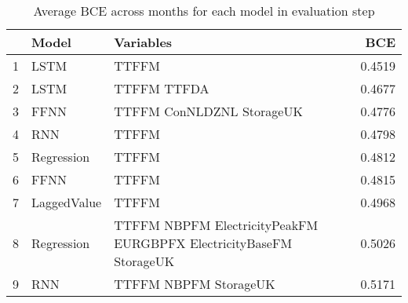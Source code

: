 \begin{table}[ht]
\centering
\begin{tabular}{rllr}
  \hline
 & Model & Variables & BCE \\ 
  \hline
1 & LSTM & TTFFM  & 0.4519 \\ 
  2 & LSTM & TTFFM TTFDA & 0.4677 \\ 
  3 & FFNN & TTFFM ConNLDZNL StorageUK & 0.4776 \\ 
  4 & RNN & TTFFM  & 0.4798 \\ 
  5 & Regression & TTFFM  & 0.4812 \\ 
  6 & FFNN & TTFFM  & 0.4815 \\ 
  7 & LaggedValue & TTFFM  & 0.4968 \\ 
  8 & Regression & TTFFM NBPFM ElectricityPeakFM EURGBPFX ElectricityBaseFM StorageUK & 0.5026 \\ 
  9 & RNN & TTFFM NBPFM StorageUK & 0.5171 \\ 
   \hline
\end{tabular}
\caption{Average BCE across months for each model in evaluation step} 
\label{tab:binary.eval.short}
\end{table}
